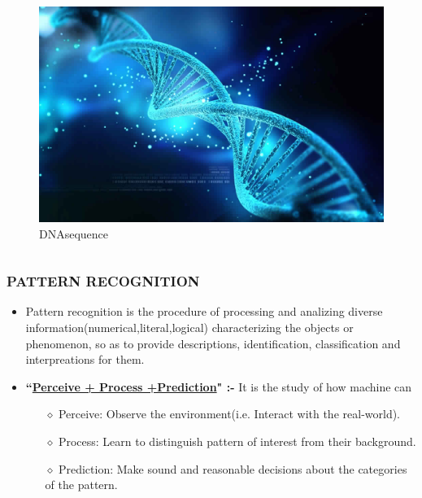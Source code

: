 \documentclass{beamer}
\begin{document}
\begin{frame}
\begin{columns}
\begin{column}{.3\textwidth}
\begin{figure}
\includegraphics[width=\textwidth]{dna.jpg}
\caption {DNAsequence}
\end{figure}

\end{column}
\end{columns}

 
\end{frame}

\begin{frame}
\transdissolve

\frametitle{PATTERN RECOGNITION}%
\begin{itemize}
\item {}
 Pattern recognition is the procedure of processing and analizing diverse information(numerical,literal,logical) characterizing the objects or phenomenon, so as to provide descriptions, identification, classification and interpreations for them.
 \item {} {{\bf{``\underline {Perceive + Process +Prediction}" :-}} It is the study of how machine can}
 \begin{itemize}
 \item[$\diamond$] 
Perceive: Observe the environment(i.e. Interact with the real-world). 
 \item[$\diamond$]
Process: Learn to distinguish pattern of interest from their background. 
 \item[$\diamond$]
 Prediction: Make sound and reasonable decisions about the categories of the pattern. 
 \end{itemize}
\end{itemize}
\end{frame}
\end{document}
